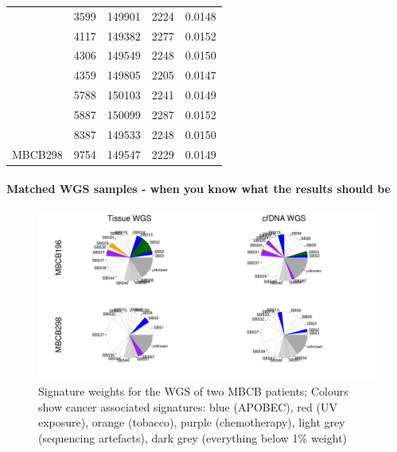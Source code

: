 \begin{table}
\begin{tabular}{|c|c|c|c|c|}
 & \num{3599} & \num{149901} &  \num{2224} & \num{0.0148}\\ 
 & \num{4117} & \num{149382} &  \num{2277} & \num{0.0152}\\ 
 & \num{4306} & \num{149549} &  \num{2248} & \num{0.0150}\\ 
 & \num{4359} & \num{149805} &  \num{2205} & \num{0.0147}\\ 
 & \num{5788} & \num{150103} &  \num{2241} & \num{0.0149}\\ 
 & \num{5887} & \num{150099} &  \num{2287} & \num{0.0152}\\ 
 & \num{8387} & \num{149533} &  \num{2248} & \num{0.0150}\\ 
\multirow{-9}{*}{MBCB298} & \num{9754} & \num{149547} &  \num{2229} & \num{0.0149}\\
\hline
\bottomrule
\end{tabular}
\end{table}





\paragraph{Matched WGS samples - when you know what the results should be}
\label{mmf-sec:matchedMBCB}

\begin{figure}[ht]
\centering
\includegraphics[width=.99\linewidth]{Figures/MisMatchFinder/mbcbWGSsignatures.pdf}
\caption[Signature weights for the WGS of two MBCB patients]{Signature weights for the WGS of two MBCB patients; Colours show cancer associated signatures: blue (APOBEC), red (UV exposure), orange (tobacco), purple (chemotherapy), light grey (sequencing artefacts), dark grey (everything below 1\% weight)}\label{fig:mmf-mbcbWGSsigPie}
\end{figure}
 
